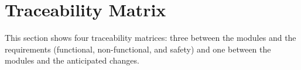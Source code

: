 \documentclass[12pt, titlepage]{article}
\newcommand{\mref}[1]{M\ref{#1}}
\begin{document}
\section{Traceability Matrix} \label{SecTM}

This section shows four traceability matrices: three between the modules and the
requirements (functional, non-functional, and safety) and one between the modules and the anticipated changes.


\renewcommand{\arraystretch}{1.2}
\setlength{\tabcolsep}{6pt}
\end{document}
